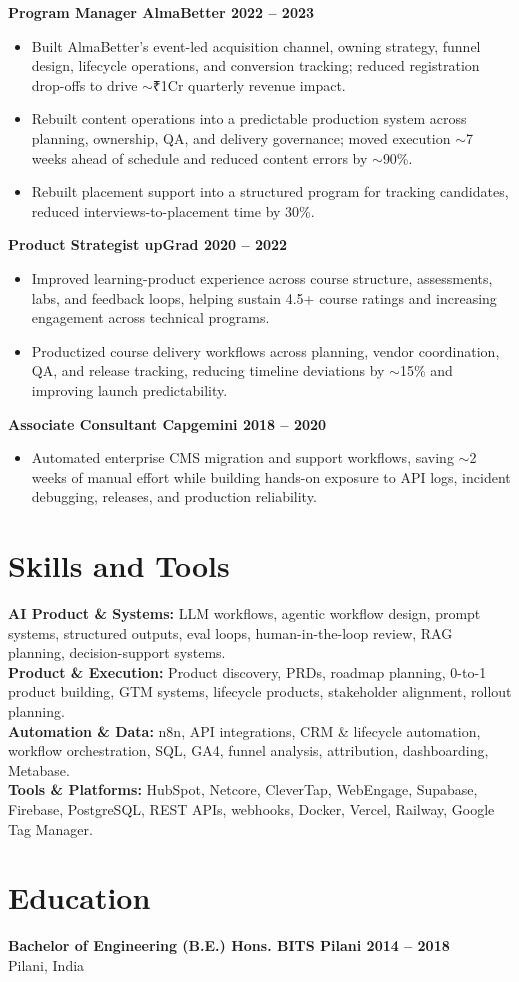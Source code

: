 \documentclass[10pt,a4paper]{article}
\begin{document}
\textbf{Program Manager \textbar{} AlmaBetter \textbar{} 2022 -- 2023}
\begin{itemize}
  \item Built AlmaBetter's event-led acquisition channel, owning strategy, funnel design, lifecycle operations, and conversion tracking; reduced registration drop-offs to drive $\sim$₹1Cr quarterly revenue impact.
  \item Rebuilt content operations into a predictable production system across planning, ownership, QA, and delivery governance; moved execution $\sim$7 weeks ahead of schedule and reduced content errors by $\sim$90\%.
  \item Rebuilt placement support into a structured program for tracking candidates, reduced interviews-to-placement time by 30\%.
\end{itemize}

\textbf{Product Strategist \textbar{} upGrad \textbar{} 2020 -- 2022}
\begin{itemize}
  \item Improved learning-product experience across course structure, assessments, labs, and feedback loops, helping sustain 4.5+ course ratings and increasing engagement across technical programs.
  \item Productized course delivery workflows across planning, vendor coordination, QA, and release tracking, reducing timeline deviations by $\sim$15\% and improving launch predictability.
\end{itemize}

\textbf{Associate Consultant \textbar{} Capgemini \textbar{} 2018 -- 2020}
\begin{itemize}
  \item Automated enterprise CMS migration and support workflows, saving $\sim$2 weeks of manual effort while building hands-on exposure to API logs, incident debugging, releases, and production reliability.
\end{itemize}

\section*{Skills and Tools}
\textbf{AI Product \& Systems:} LLM workflows, agentic workflow design, prompt systems, structured outputs, eval loops, human-in-the-loop review, RAG planning, decision-support systems. \\
\textbf{Product \& Execution:} Product discovery, PRDs, roadmap planning, 0-to-1 product building, GTM systems, lifecycle products, stakeholder alignment, rollout planning. \\
\textbf{Automation \& Data:} n8n, API integrations, CRM \& lifecycle automation, workflow orchestration, SQL, GA4, funnel analysis, attribution, dashboarding, Metabase. \\
\textbf{Tools \& Platforms:} HubSpot, Netcore, CleverTap, WebEngage, Supabase, Firebase, PostgreSQL, REST APIs, webhooks, Docker, Vercel, Railway, Google Tag Manager.

\section*{Education}
\textbf{Bachelor of Engineering (B.E.) Hons. \textbar{} BITS Pilani \textbar{} 2014 -- 2018} \\
Pilani, India
\end{document}
